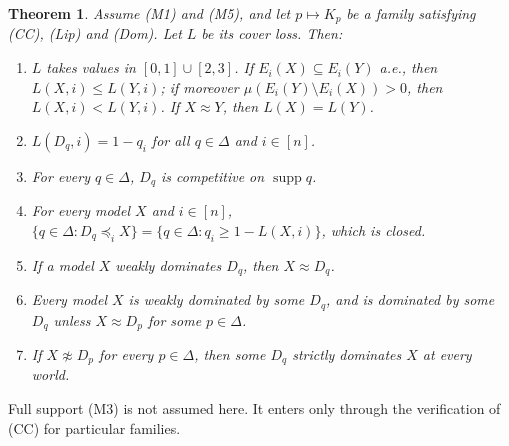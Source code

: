 \documentclass[11pt]{article}
\newtheorem{theorem}{Theorem}[section]
\theoremstyle{definition}
\newcommand{\supp}{\operatorname{supp}}
\begin{document}
\begin{theorem}\label{thm:cover}
Assume (M1) and (M5), and let $p\mapsto K_p$ be a family satisfying (CC), (Lip) and (Dom). Let $L$ be its cover loss. Then:
\begin{enumerate}[label=(\alph*)]
\item $L$ takes values in $[0,1]\cup[2,3]$. If $E_i(X)\subseteq E_i(Y)$ a.e., then $L(X,i)\le L(Y,i)$; if moreover $\mu(E_i(Y)\setminus E_i(X))>0$, then $L(X,i)<L(Y,i)$. If $X\approx Y$, then $L(X)=L(Y)$.
\item $L(D_q,i)=1-q_i$ for all $q\in\Delta$ and $i\in[n]$.
\item For every $q\in\Delta$, $D_q$ is competitive on $\supp q$.
\item For every model $X$ and $i\in[n]$, $\{q\in\Delta:D_q\preceq_iX\}=\{q\in\Delta:q_i\ge1-L(X,i)\}$, which is closed.
\item If a model $X$ weakly dominates $D_q$, then $X\approx D_q$.
\item Every model $X$ is weakly dominated by some $D_q$, and is dominated by some $D_q$ unless $X\approx D_p$ for some $p\in\Delta$.
\item If $X\not\approx D_p$ for every $p\in\Delta$, then some $D_q$ strictly dominates $X$ at every world.
\end{enumerate}
\end{theorem}

Full support (M3) is not assumed here. It enters only through the verification of (CC) for particular families.
\end{document}

